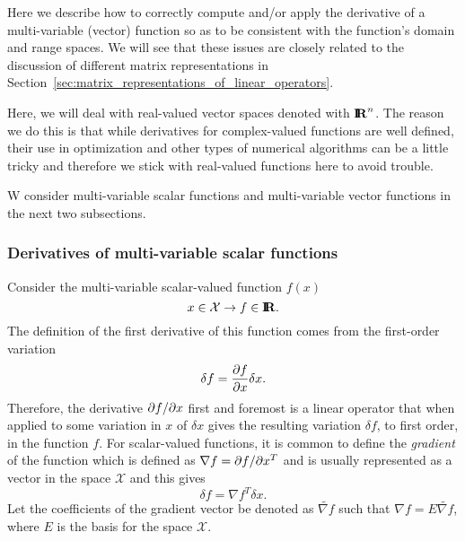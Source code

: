Here we describe how to correctly compute and/or apply the derivative of a
multi-variable (vector) function so as to be consistent with the function's
domain and range spaces.  We will see that these issues are closely related to
the discussion of different matrix representations in
Section~\ref{sec:matrix_representations_of_linear_operators}.

Here, we will deal with real-valued vector spaces denoted with $\mbox{\textbf{I}}\hspace{-0.6ex}\mbox{\textbf{R}}^n$.  The
reason we do this is that while derivatives for complex-valued functions are
well defined, their use in optimization and other types of numerical
algorithms can be a little tricky and therefore we stick with real-valued
functions here to avoid trouble.

W consider multi-variable scalar functions and multi-variable vector functions
in the next two subsections.

\subsubsection{Derivatives of multi-variable scalar functions}
\label{sec:scalar_function_derivatives}
 
Consider the multi-variable scalar-valued function $f(x)$
\[
x\in\mathcal{X} \rightarrow f\in\mbox{\textbf{I}}\hspace{-0.6ex}\mbox{\textbf{R}}.
\]
The definition of the first derivative of this function comes from the
first-order variation
\[
\delta f = \displaystyle{\frac{\partial f}{\partial x}} \delta x.
\]
Therefore, the derivative $\partial f / \partial x$ first and foremost is a linear operator
that when applied to some variation in $x$ of $\delta x$ gives the resulting
variation $\delta f$, to first order, in the function $f$.  For scalar-valued
functions, it is common to define the {}\textit{gradient} of the function
which is defined as $\nabla f = \partial f / \partial x^T$ and is usually represented as a
vector in the space $\mathcal{X}$ and this gives
\[
\delta f = {\nabla f}^T \delta x.
\]
Let the coefficients of the gradient vector be denoted as $\tilde{\nabla f}$
such that $\nabla f = E {}\tilde{\nabla f}$, where $E$ is the basis for the
space $\mathcal{X}$.

